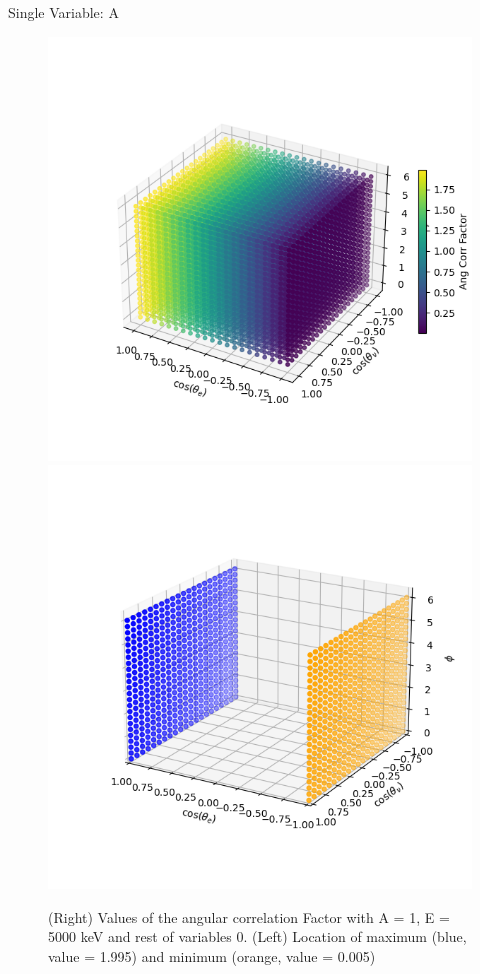 \documentclass{beamer}
\begin{document}
\begin{frame}{Single Variable: A}
	\begin{figure}
		\centering
		\includegraphics[width=0.4\paperwidth]{plots/A_3D_image.png}
		\includegraphics[width=0.4\paperwidth]{plots/A_max_min.png}
		\caption{(Right) Values of the angular correlation Factor with A = 1, E = 5000 keV and rest of variables 0. (Left) Location of maximum (blue, value = 1.995) and minimum (orange, value = 0.005)}
	\end{figure}
\end{frame}
\end{document}
